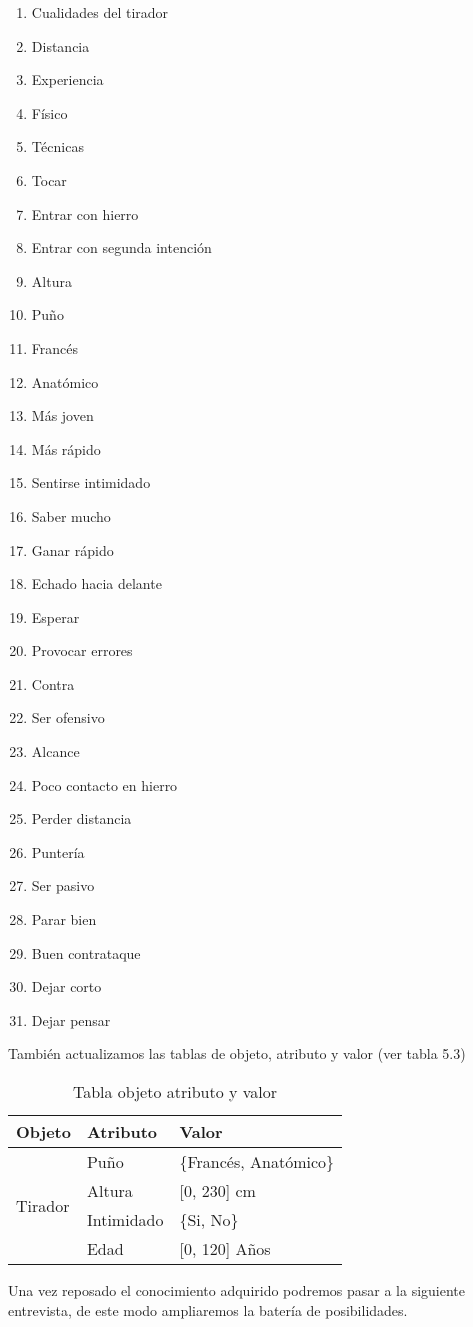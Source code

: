 \begin{enumerate}

  \item Cualidades del tirador
  \item Distancia
  \item Experiencia
  \item Físico
  \item Técnicas
  \item Tocar
  \item Entrar con hierro
  \item Entrar con segunda intención
  \item Altura
  \item Puño
  \item Francés
  \item Anatómico
  \item Más joven
  \item Más rápido
  \item Sentirse intimidado
  \item Saber mucho
  \item Ganar rápido
  \item Echado hacia delante
  \item Esperar
  \item Provocar errores
  \item Contra
  \item Ser ofensivo
  \item Alcance
  \item Poco contacto en hierro
  \item Perder distancia
  \item Puntería
  \item Ser pasivo
  \item Parar bien
  \item Buen contrataque
  \item Dejar corto
  \item Dejar pensar

\end{enumerate}

También actualizamos las tablas de objeto, atributo y valor (ver tabla 5.3)

\begin{table}[]
  \centering
  \caption{Tabla objeto atributo y valor}
  \label{tab:Tabla objeto atributo y valor}
  \begin{tabular}{lll}
    Objeto & Atributo & Valor \\ \hline
    \multicolumn{1}{l|}{\multirow{4}{*}{Tirador}} & Puño & \{Francés, Anatómico\} \\ \cline{2-3}
    \multicolumn{1}{l|}{} & Altura & {[}0, 230{]} cm \\ \cline{2-3}
    \multicolumn{1}{l|}{} & Intimidado & \{Si, No\} \\ \cline{2-3}
    \multicolumn{1}{l|}{} & Edad & {[}0, 120{]} Años \\ \cline{2-3}
  \end{tabular}
\end{table}

Una vez reposado el conocimiento adquirido podremos pasar a la siguiente entrevista,
de este modo ampliaremos la batería de posibilidades.
